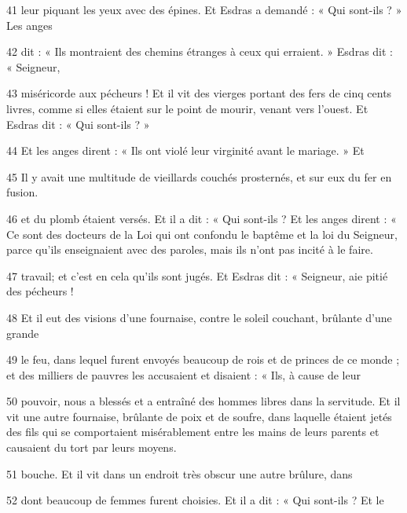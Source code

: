 \par 41 leur piquant les yeux avec des épines. Et Esdras a demandé : « Qui sont-ils ? » Les anges

\par 42 dit : « Ils montraient des chemins étranges à ceux qui erraient. » Esdras dit : « Seigneur,

\par 43 miséricorde aux pécheurs ! Et il vit des vierges portant des fers de cinq cents livres, comme si elles étaient sur le point de mourir, venant vers l'ouest. Et Esdras dit : « Qui sont-ils ? »

\par 44 Et les anges dirent : « Ils ont violé leur virginité avant le mariage. » Et

\par 45 Il y avait une multitude de vieillards couchés prosternés, et sur eux du fer en fusion.

\par 46 et du plomb étaient versés. Et il a dit : « Qui sont-ils ? Et les anges dirent : « Ce sont des docteurs de la Loi qui ont confondu le baptême et la loi du Seigneur, parce qu'ils enseignaient avec des paroles, mais ils n'ont pas incité à le faire.

\par 47 travail; et c’est en cela qu’ils sont jugés. Et Esdras dit : « Seigneur, aie pitié des pécheurs !

\par 48 Et il eut des visions d'une fournaise, contre le soleil couchant, brûlante d'une grande

\par 49 le feu, dans lequel furent envoyés beaucoup de rois et de princes de ce monde ; et des milliers de pauvres les accusaient et disaient : « Ils, à cause de leur

\par 50 pouvoir, nous a blessés et a entraîné des hommes libres dans la servitude. Et il vit une autre fournaise, brûlante de poix et de soufre, dans laquelle étaient jetés des fils qui se comportaient misérablement entre les mains de leurs parents et causaient du tort par leurs moyens.

\par 51 bouche. Et il vit dans un endroit très obscur une autre brûlure, dans

\par 52 dont beaucoup de femmes furent choisies. Et il a dit : « Qui sont-ils ? Et le


